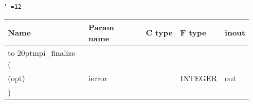 \begingroup\tt\catcode`\_=12
\begin{tabular}{lllll}
\toprule
\textrm{Name}&\textrm{Param name}&\textrm{C type}&\textrm{F type}&\textrm{inout}\\
\midrule
\hbox to 20pt{mpi_finalize (\hss} \\
(opt)&ierror&&INTEGER&out\\
)\\
\bottomrule
\end{tabular}
\endgroup

